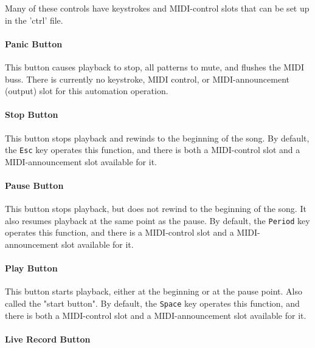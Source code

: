 \documentclass[
 11pt,
 twoside,
 a4paper,
 headinclude,
 footinclude,
 final                                 %
]{article}
\begin{document}
   Many of these controls have keystrokes and MIDI-control slots that can be
   set up in the 'ctrl' file.

\paragraph{Panic Button}
\label{paragraph:introduction_panic_button}

   This button causes playback to stop, all patterns to mute, and flushes the
   MIDI buss.
   There is currently no keystroke, MIDI control, or MIDI-announcement (output)
   slot for this automation operation.

\paragraph{Stop Button}
\label{paragraph:introduction_stop_button}

   This button stops playback and rewinds to the beginning of the song.
   By default, the \texttt{Esc} key operates this function,
   and there is both a MIDI-control slot and a MIDI-announcement slot
   available for it.

\paragraph{Pause Button}
\label{paragraph:introduction_pause_button}

   This button stops playback, but does not rewind to the beginning of the song.
   It also resumes playback at the same point as the pause.
   By default, the \texttt{Period} key operates this function,
   and there is a MIDI-control slot and a MIDI-announcement slot available for
   it.

\paragraph{Play Button}
\label{paragraph:introduction_play_button}

   This button starts playback, either at the beginning or at the pause point.
   Also called the "start button".
   By default, the \texttt{Space} key operates this function,
   and there is both a MIDI-control slot and a MIDI-announcement slot
   available for it.

\paragraph{Live Record Button}
\label{paragraph:introduction_live_record_button}
\end{document}
